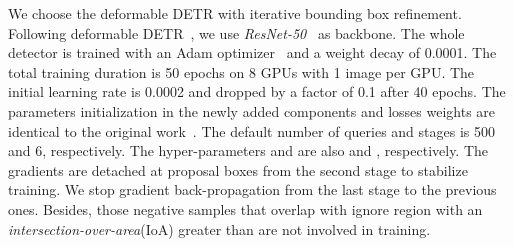 \documentclass[final]{cvpr}
\begin{document}
We choose the deformable DETR with iterative bounding box refinement. Following deformable DETR~\cite{zhu2021deformable}, we use \emph{ResNet-50}~\cite{he2016deep} as backbone. The whole detector is trained with an Adam optimizer~\cite{kingma2014adam} and a weight decay of 0.0001. The total training duration is 50 epochs on 8 GPUs with 1 image per GPU. The initial learning rate is 0.0002 and dropped by a factor of 0.1 after 40 epochs. The parameters initialization in the newly added components and losses weights are identical to the original work~\cite{zhu2021deformable}. The default number of queries and stages is 500 and 6, respectively. The hyper-parameters  and  are also  and , respectively. The gradients are detached at proposal boxes from the second stage to stabilize training. We stop gradient back-propagation from the last stage to the previous ones. Besides, those negative samples that overlap with ignore region with an \textit{intersection-over-area}(IoA) greater than  are not involved in training.
\end{document}
